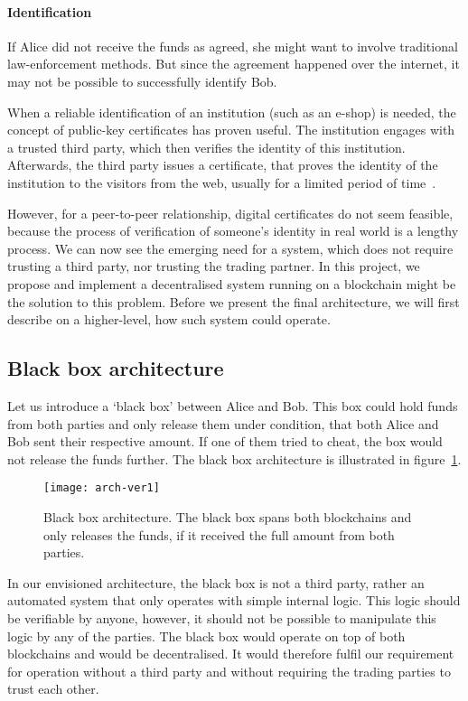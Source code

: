 \paragraph{Identification} 
If Alice did not receive the funds as agreed, she might want to involve traditional law-enforcement methods. But since the agreement happened over the internet, it may not be possible to successfully identify Bob.

When a reliable identification of an institution (such as an e-shop) is needed, the concept of public-key certificates has proven useful. The institution engages with a trusted third party, which then verifies the identity of this institution. Afterwards, the third party issues a certificate, that proves the identity of the institution to the visitors from the web, usually for a limited period of time~\cite{Lee2013SecurityArchitects}. 

However, for a peer-to-peer relationship, digital certificates do not seem feasible, because the process of verification of someone's identity in real world is a lengthy process. We can now see the emerging need for a system, which does not require trusting a third party, nor trusting the trading partner. In this project, we propose and implement a decentralised system running on a blockchain might be the solution to this problem. Before we present the final architecture, we will first describe on a higher-level, how such system could operate.

\subsection{Black box architecture}
Let us introduce a `black box' between Alice and Bob. This box could hold funds from both parties and only release them under condition, that both Alice and Bob sent their respective amount. If one of them tried to cheat, the box would not release the funds further. The black box architecture is illustrated in figure~\ref{fig:arch-ver1}.
% 
\begin{figure}[ht]
    \centering
    \texttt{[image: arch-ver1]}
    \caption{Black box architecture. The black box spans both blockchains and only releases the funds, if it received the full amount from both parties.}
    \label{fig:arch-ver1}
\end{figure}

In our envisioned architecture, the black box is not a third party, rather an automated system that only operates with simple internal logic. This logic should be verifiable by anyone, however, it should not be possible to manipulate this logic by any of the parties. The black box would operate on top of both blockchains and would be decentralised. It would therefore fulfil our requirement for operation without a third party and without requiring the trading parties to trust each other.

